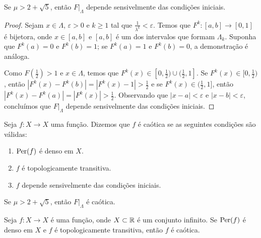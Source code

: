 \begin{proposition}
\label{proposicao caos 3}
Se $\mu > 2 + \sqrt{5}$, então $F|_\Lambda$ depende sensivelmente das condições iniciais.
\end{proposition}

\begin{proof}
Sejam $x \in \Lambda$, $\varepsilon > 0$ e $k \geq 1$ tal que $\frac{1}{\lambda^k} < \varepsilon$.
Temos que $F^k: [a, b] \to [0, 1]$ é bijetora, onde $x \in [a, b]$ e $[a, b]$ é um dos intervalos que formam $\Lambda_k$. Suponha que $F^k(a) = 0$ e $F^k(b) = 1$; se $F^k(a) = 1$ e $F^k(b) = 0$, a demonstração é análoga.

Como $F(\frac{1}{2}) > 1$ e $x \in \Lambda$, temos que $F^{k}(x) \in [0, \frac{1}{2}) \cup (\frac{1}{2}, 1]$. Se $F^{k}(x) \in [0, \frac{1}{2})$, então $|F^k(x) - F^k(b)| = |F^k(x) - 1| > \frac{1}{2}$ e se $F^{k}(x) \in (\frac{1}{2}, 1]$, então $|F^k(x) - F^k(a)| = |F^k(x)| > \frac{1}{2}$. Observando que $|x - a| < \varepsilon$ e  $|x - b| < \varepsilon$, concluímos que $F|_\Lambda$ depende sensivelmente das condições iniciais.
\end{proof}

\begin{definition}
Seja $f: X \to X$ uma função. Dizemos que $f$ é caótica se as seguintes condições são válidas:
\begin{enumerate}[label=\roman*.]
\item $\operatorname{Per}(f)$ é denso em $X$.
\item $f$ é topologicamente transitiva.
\item $f$ depende sensivelmente das condições iniciais.
\end{enumerate}
\end{definition}

\begin{theorem} \label{teorema caos 1}
Se $\mu > 2 + \sqrt{5}$, então $F|_\Lambda$ é caótica.
\end{theorem}

\begin{theorem} \label{teorema caos 2}
Seja $f: X \to X$ é uma função, onde $X \subset \mathbb{R}$ é um conjunto infinito. Se $\operatorname{Per}(f)$ é denso em $X$ e $f$ é topologicamente transitiva, então $f$ é caótica.
\end{theorem}
